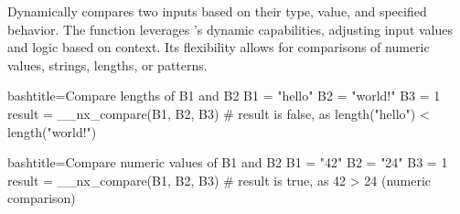 \begin{NexMainBox}
	\begin{NexMainBox}
		Dynamically compares two inputs based on their type, value, and specified behavior. The function leverages 's dynamic capabilities, adjusting input values and logic based on context. Its flexibility allows for comparisons of numeric values, strings, lengths, or patterns.
	\end{NexMainBox}
	\begin{NexMainBox}
		\begin{NexListDark}
		\end{NexListDark}
	\end{NexMainBox}
\end{NexMainBox}

\begin{NexCodeBox}{bash}{title={Compare lengths of B1 and B2}}
	B1 = "hello"
	B2 = "world!"
	B3 = 1
	result = __nx_compare(B1, B2, B3)
	# result is false, as length("hello") < length("world!")
\end{NexCodeBox}

\begin{NexCodeBox}{bash}{title={Compare numeric values of B1 and B2}}
	B1 = "42"
	B2 = "24"
	B3 = 1
	result = __nx_compare(B1, B2, B3)
	# result is true, as 42 > 24 (numeric comparison)
\end{NexCodeBox}

